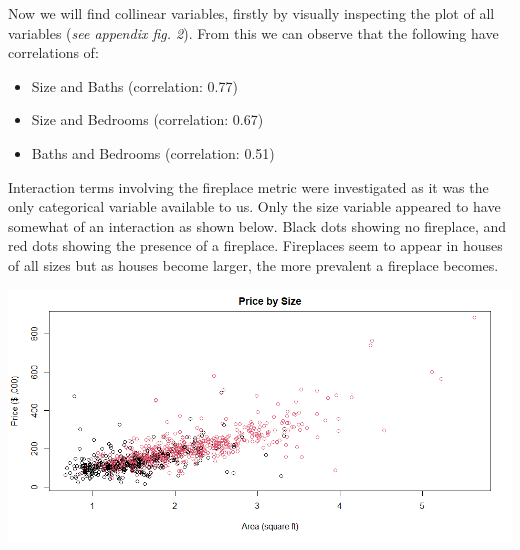 \documentclass[10pt,A4,makeidx]{article}
\begin{document}
  Now we will find collinear variables, firstly by visually inspecting the plot
  of all variables (\emph{see appendix fig. 2}). From this we can observe that the
  following have correlations of:
  \begin{itemize}
    \item Size and Baths (correlation: 0.77)
    \item Size and Bedrooms (correlation: 0.67)
    \item Baths and Bedrooms (correlation: 0.51)\\
  \end{itemize}
  
  Interaction terms involving the fireplace metric were investigated as it was the only 
  categorical variable available to us. Only the size variable appeared to
  have somewhat of an interaction as shown below. Black dots showing no fireplace, and
  red dots showing the presence of a fireplace. Fireplaces seem to appear in houses 
  of all sizes but as houses become larger, the more prevalent a fireplace becomes.\\
  \begin{center}
    \includegraphics[width=15cm]{int-fireplacesize.png}
  \end{center}
  
  
\end{document}

